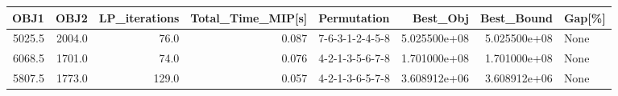 \begin{tabular}{rrrrlrrl}
\toprule
   OBJ1 &    OBJ2 &  LP\_iterations &  Total\_Time\_MIP[s] &      Permutation &      Best\_Obj &    Best\_Bound & Gap[\%] \\
\midrule
 5025.5 &  2004.0 &           76.0 &              0.087 &  7-6-3-1-2-4-5-8 &  5.025500e+08 &  5.025500e+08 &   None \\
 6068.5 &  1701.0 &           74.0 &              0.076 &  4-2-1-3-5-6-7-8 &  1.701000e+08 &  1.701000e+08 &   None \\
 5807.5 &  1773.0 &          129.0 &              0.057 &  4-2-1-3-6-5-7-8 &  3.608912e+06 &  3.608912e+06 &   None \\
\bottomrule
\end{tabular}
